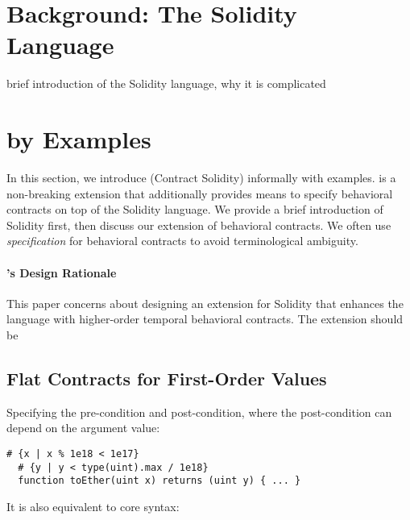 \section{Background: The Solidity Language}

brief introduction of the Solidity language, why it is complicated

\section{\lang by Examples}

In this section, we introduce \lang (Contract Solidity) informally with examples.
\lang is a non-breaking extension that additionally provides means
to specify behavioral contracts on top of the Solidity language.
We provide a brief introduction of Solidity first, then discuss our extension
of behavioral contracts.
We often use \emph{specification} for behavioral contracts to avoid terminological ambiguity.

\paragraph{\lang's Design Rationale}
This paper concerns about designing an extension for Solidity that enhances the
language with higher-order temporal behavioral contracts.
The extension should be


\subsection{Flat Contracts for First-Order Values}

Specifying the pre-condition and post-condition, where the post-condition
can depend on the argument value:


\begin{lstlisting}[language=Solidity]
  # {x | x % 1e18 < 1e17}
  # {y | y < type(uint).max / 1e18}
  function toEther(uint x) returns (uint y) { ... }
\end{lstlisting}

It is also equivalent to core syntax:

